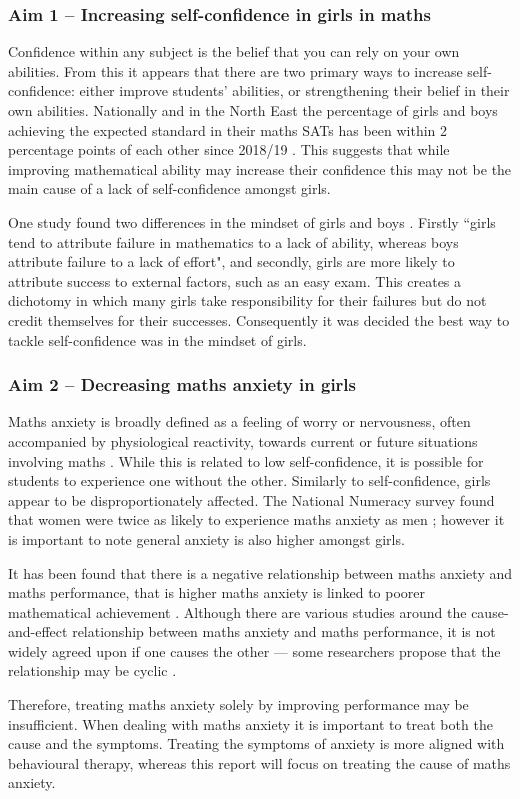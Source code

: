\documentclass[11pt, a4paper, notitlepage]{article}
\begin{document}
\subsubsection*{Aim 1 -- Increasing self-confidence in girls in maths} 
Confidence within any subject is the belief that you can rely on your own abilities. From this it appears that there are two primary ways to increase self-confidence: either improve students' abilities, or strengthening their belief in their own abilities. Nationally and in the North East the percentage of girls and boys achieving the expected standard in their maths SATs has been within 2 percentage points of each other since 2018/19 \cite{maths_SATs_stats}. This suggests that while improving mathematical ability may increase their confidence this may not be the main cause of a lack of self-confidence amongst girls.
\par
One study  found two differences in the mindset of girls and boys \cite{Georgiou01122007}. Firstly ``girls tend to attribute failure in mathematics to a lack of ability, whereas boys attribute failure to a lack of effort", and secondly, girls are more likely to attribute success to external factors, such as an easy exam. This creates a dichotomy in which many girls take responsibility for their failures but do not credit themselves for their successes. Consequently it was decided the best way to tackle self-confidence was in the mindset of girls.
\subsubsection*{Aim 2 -- Decreasing maths anxiety in girls}
Maths anxiety is broadly defined as a feeling of worry or nervousness, often accompanied by physiological reactivity, towards current or future situations involving maths \cite{Luttenberger:2018}. While this is related to low self-confidence, it is possible for students to experience one without the other. Similarly to self-confidence, girls appear to be disproportionately affected. The National Numeracy survey found that women were twice as likely to experience maths anxiety as men \cite{NationalNumeracy_anxiety}; however it is important to note general anxiety is also higher amongst girls.
\par
It has been found that there is a negative relationship between maths anxiety and maths performance, that is higher maths anxiety is linked to poorer mathematical achievement \cite{Chang:2016}. 
Although there are various studies around the cause-and-effect relationship between maths anxiety and maths performance, it is not widely agreed upon if one causes the other --- some researchers propose that the relationship may be cyclic \cite{Chang:2016}. 
\par
Therefore, treating maths anxiety solely by improving performance may be insufficient. When dealing with maths anxiety it is important to treat both the cause and the symptoms. Treating the symptoms of anxiety is more aligned with behavioural therapy,  whereas this report will focus on treating the cause of maths anxiety.
\end{document}
